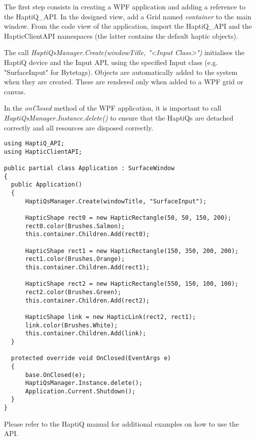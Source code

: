 The first step consists in creating a WPF application and adding a reference to the HaptiQ\_API. In the designed view, add a Grid named \textit{container} to the main window. From the code view of the application, import the HaptiQ\_API and the HapticClientAPI namespaces (the latter contains the default haptic objects). 

The call \textit{HaptiQsManager.Create(windowTitle, "\textless Input Class\textgreater")} initialises the HaptiQ device and the Input API, using the specified Input class (e.g. "SurfaceInput" for Bytetags). 
Objects are automatically added to the system when they are created. These are rendered only when added to a WPF grid or canvas. 

In the \textit{onClosed} method of the WPF application, it is important to call \textit{HaptiQsManager.Instance.delete()} to ensure that the HaptiQs are detached correctly and all resources are disposed correctly.

\lstset{style=sharpc}
\begin{lstlisting}[caption={Basic API usage},label={lst:basicAPIUsage}]
using HaptiQ_API;
using HapticClientAPI;

public partial class Application : SurfaceWindow
{
  public Application()
  {
      HaptiQsManager.Create(windowTitle, "SurfaceInput");
      
      HapticShape rect0 = new HapticRectangle(50, 50, 150, 200);
      rect0.color(Brushes.Salmon);
      this.container.Children.Add(rect0);
      
      HapticShape rect1 = new HapticRectangle(150, 350, 200, 200);
      rect1.color(Brushes.Orange);
      this.container.Children.Add(rect1);
      
      HapticShape rect2 = new HapticRectangle(550, 150, 100, 100);
      rect2.color(Brushes.Green);
      this.container.Children.Add(rect2);
      
      HapticShape link = new HapticLink(rect2, rect1);
      link.color(Brushes.White);
      this.container.Children.Add(link);
  }
  
  protected override void OnClosed(EventArgs e)
  {
      base.OnClosed(e);
      HaptiQsManager.Instance.delete();
      Application.Current.Shutdown();
  }
}
\end{lstlisting}


Please refer to the HaptiQ manual for additional examples on how to use the API. 


